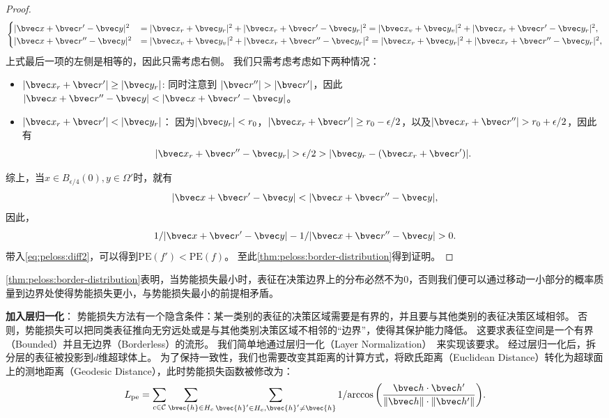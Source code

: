 \begin{proof}
\begin{equation}
\begin{cases}
    |\bvec x + \bvec r' - \bvec y|^2 & = |\bvec x_r + \bvec y_r|^2 + |\bvec x_r + \bvec r' - \bvec y_r|^2 
     = |\bvec x_v + \bvec y_v|^2 + |\bvec x_r + \bvec r' - \bvec y_r|^2, \\
    |\bvec x + \bvec r'' - \bvec y|^2 & = |\bvec x_v + \bvec y_v|^2 + |\bvec x_r + \bvec r'' - \bvec y_r|^2
    = |\bvec x_r + \bvec y_r|^2 + |\bvec x_r + \bvec r'' - \bvec y_r|^2,
\end{cases}
\end{equation}
上式最后一项的左侧是相等的，因此只需考虑右侧。
我们只需考虑考虑如下两种情况：
\begin{itemize}
    \item $|\bvec x_r + \bvec r'| \ge |\bvec y_r|$: 
    同时注意到 $|\bvec r''| > |\bvec r'|$，因此$|\bvec x + \bvec r'' - \bvec y| < |\bvec x + \bvec r' - \bvec y|$。
    \item $|\bvec x_r + \bvec r'| < |\bvec y_r|$：
    因为$|\bvec y_r| < r_0$，$|\bvec x_r + \bvec r'| \ge r_0 - \epsilon / 2$，以及$|\bvec x_r + \bvec r''| > r_0 + \epsilon / 2$，因此有
    \begin{equation}
        |\bvec x_r + \bvec r'' - \bvec y_r| > \epsilon / 2 > |\bvec y_r - (\bvec x_r + \bvec r')|.
    \end{equation}
\end{itemize}
综上，当$x \in B_{\epsilon/4}(0), y \in \Omega'$时，就有
\begin{equation}
    |\bvec x + \bvec r' - \bvec y| < |\bvec x + \bvec r'' - \bvec y|,
\end{equation}
因此，
\begin{equation}
    1 / |\bvec x + \bvec r' - \bvec y| - 1 / |\bvec x + \bvec r'' - \bvec y| > 0.
\end{equation}
带入\autoref{eq:peloss:diff2}，可以得到$\text{PE}(f') < \text{PE}(f)$。
至此\autoref{thm:peloss:border-distribution}得到证明。
\end{proof}

\autoref{thm:peloss:border-distribution}表明，当势能损失最小时，表征在决策边界上的分布必然不为0，否则我们便可以通过移动一小部分的概率质量到边界处使得势能损失更小，与势能损失最小的前提相矛盾。

\textbf{加入层归一化}：
势能损失方法有一个隐含条件：某一类别的表征的决策区域需要是有界的，并且要与其他类别的表征决策区域相邻。
否则，势能损失可以把同类表征推向无穷远处或是与其他类别决策区域不相邻的“边界”，使得其保护能力降低。
%
这要求表征空间是一个有界（Bounded）并且无边界（Borderless）的流形。
%
我们简单地通过层归一化（Layer Normalization）~\cite{hinton_2016_layernorm}来实现该要求。
%
经过层归一化后，拆分层的表征被投影到$d$维超球体上。
%
为了保持一致性，我们也需要改变其距离的计算方式，将欧氏距离（Euclidean Distance）转化为超球面上的测地距离（Geodesic Distance），此时势能损失函数被修改为：
\begin{equation}
    L_\text{pe} = \sum\limits_{c\in\mathcal C}\sum\limits_{\bvec{h} \in H_c}\sum\limits_{\bvec{h}' \in H_c, \bvec{h}' \ne \bvec{h}} {1}/{\arccos \left({\bvec h \cdot \bvec h'} \over {\Vert \bvec h \Vert \cdot \Vert \bvec h' \Vert}\right)}.
\end{equation}
%

